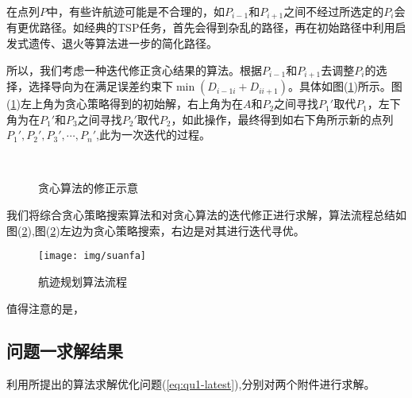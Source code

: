 在点列$P$中，有些许航迹可能是不合理的，如$P_{i-1}$和$P_{i+1}$之间不经过所选定的$P_{i}$会有更优路径。如经典的TSP任务，首先会得到杂乱的路径，再在初始路径中利用启发式遗传、退火等算法进一步的简化路径。

所以，我们考虑一种迭代修正贪心结果的算法。根据$P_{i-1}$和$P_{i+1}$去调整$P_{i}$的选择，选择导向为在满足误差约束下$\min(D_{i-1i}+ D_{ii+1})$。具体如图(\ref{fig:xiuzheng})所示。图(\ref{fig:xiuzheng})左上角为贪心策略得到的初始解，右上角为在$A$和$P_{2}$之间寻找$P_{1}'$取代$P_{1}$，左下角为在$P_{1}'$和$P_{3}$之间寻找$P_{2}'$取代$P_{2}$，如此操作，最终得到如右下角所示新的点列$P_1',P_2',P_3',\cdots,P_n'$,此为一次迭代的过程。
\begin{figure} 
	\centering
	 \quad
	\\
     \quad
	\caption{贪心算法的修正示意}
	\label{fig:xiuzheng}
\end{figure}

我们将综合贪心策略搜索算法和对贪心算法的迭代修正进行求解，算法流程总结如图(\ref{fig:suanfa}),图(\ref{fig:suanfa})左边为贪心策略搜索，右边是对其进行迭代寻优。
\begin{figure}[h]
    \centering
    \texttt{[image: img/suanfa]}
    \caption{航迹规划算法流程}
    \label{fig:suanfa}
\end{figure}

值得注意的是，{}

\subsection{问题一求解结果}
利用所提出的算法求解优化问题(\ref{eq:qu1-latest}),分别对两个附件进行求解。

